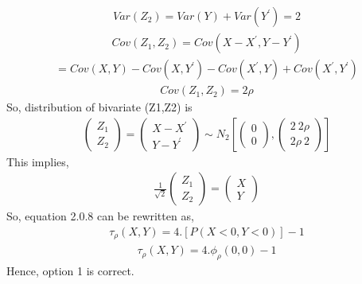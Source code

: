 \documentclass[journal,12pt,twocolumn]{IEEEtran}
\begin{document}
\begin{align}
   Var(Z_{2}) = Var(Y)+Var(Y^\prime) = 2
\end{align}
\begin{align}
   Cov(Z_{1},Z_{2}) = Cov (X-X^\prime,Y-Y^\prime)
\end{align}
\begin{align}
  = Cov(X,Y)-Cov(X,Y^\prime)-Cov(X^\prime,Y)+Cov(X^\prime,Y^\prime)
\end{align}
\begin{align}
    Cov(Z_{1},Z_{2}) = 2\rho
\end{align}
So, distribution of bivariate (Z1,Z2) is 
\begin{align}
\begin{pmatrix}Z_{1}\\Z_{2}\end{pmatrix}=\begin{pmatrix}X-X^\prime\\Y-Y^\prime\end{pmatrix} \sim N_{2} \left[\begin{pmatrix}0\\0\end{pmatrix},\begin{pmatrix}2\ 2\rho\\ 2\rho\ 2\end{pmatrix} \right]
\end{align}
This implies,
\begin{align}
    \frac{1}{\sqrt{2}}\begin{pmatrix}Z_{1}\\Z_{2}\end{pmatrix}=\begin{pmatrix}X\\Y\end{pmatrix}
\end{align}
So, equation 2.0.8 can be rewritten as,
\begin{align}
    \tau_{\rho}(X,Y) = 4.[P(X<0,Y<0)]-1
\end{align}
\begin{align}
    \tau_{\rho}(X,Y) = 4.\phi_{\rho}(0,0)-1
\end{align}
Hence, option 1 is correct.
\end{document}
